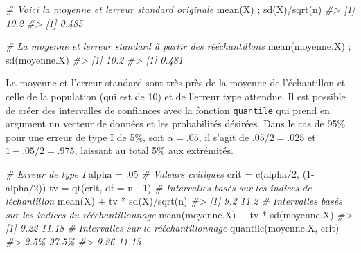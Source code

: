 \documentclass[
]{book}
\newenvironment{Shaded}{}{}
\newcommand{\AttributeTok}[1]{#1}
\newcommand{\CommentTok}[1]{\textit{#1}}
\newcommand{\DecValTok}[1]{#1}
\newcommand{\FunctionTok}[1]{#1}
\newcommand{\NormalTok}[1]{#1}
\newcommand{\OtherTok}[1]{#1}
\newcommand{\SpecialCharTok}[1]{#1}
\begin{document}
\begin{Shaded}
\begin{Highlighting}[]
\CommentTok{\# Voici la moyenne et l\textquotesingle{}erreur standard originale}
\FunctionTok{mean}\NormalTok{(X) ; }\FunctionTok{sd}\NormalTok{(X)}\SpecialCharTok{/}\FunctionTok{sqrt}\NormalTok{(n)}
\CommentTok{\#\textgreater{} [1] 10.2}
\CommentTok{\#\textgreater{} [1] 0.485}

\CommentTok{\# La moyenne et l\textquotesingle{}erreur standard à  partir des rééchantillons}
\FunctionTok{mean}\NormalTok{(moyenne.X)  ; }\FunctionTok{sd}\NormalTok{(moyenne.X)}
\CommentTok{\#\textgreater{} [1] 10.2}
\CommentTok{\#\textgreater{} [1] 0.481}
\end{Highlighting}
\end{Shaded}

La moyenne et l'erreur standard sont très près de la moyenne de l'échantillon et celle de la population (qui est de 10) et de l'erreur type attendue. Il est possible de créer des intervalles de confiances avec la fonction \texttt{quantile} qui prend en argument un vecteur de données et les probabilités désirées. Dans le cas de 95\% pour une erreur de type I de 5\%, soit \(\alpha=.05\), il s'agit de \(.05/2 = .025\) et \(1-.05/2= .975\), laissant au total 5\% aux extrémités.

\begin{Shaded}
\begin{Highlighting}[]
\CommentTok{\# Erreur de type I}
\NormalTok{alpha }\OtherTok{=}\NormalTok{ .}\DecValTok{05}
\CommentTok{\# Valeurs critiques}
\NormalTok{crit }\OtherTok{=} \FunctionTok{c}\NormalTok{(alpha}\SpecialCharTok{/}\DecValTok{2}\NormalTok{, (}\DecValTok{1}\SpecialCharTok{{-}}\NormalTok{alpha}\SpecialCharTok{/}\DecValTok{2}\NormalTok{))}
\NormalTok{tv }\OtherTok{=} \FunctionTok{qt}\NormalTok{(crit, }\AttributeTok{df =}\NormalTok{ n }\SpecialCharTok{{-}} \DecValTok{1}\NormalTok{)}
\CommentTok{\# Intervalles basés sur les indices de l\textquotesingle{}échantillon}
\FunctionTok{mean}\NormalTok{(X) }\SpecialCharTok{+}\NormalTok{ tv }\SpecialCharTok{*} \FunctionTok{sd}\NormalTok{(X)}\SpecialCharTok{/}\FunctionTok{sqrt}\NormalTok{(n)}
\CommentTok{\#\textgreater{} [1]  9.2 11.2}
\CommentTok{\# Intervalles basés sur les indices du rééchantillonnage}
\FunctionTok{mean}\NormalTok{(moyenne.X) }\SpecialCharTok{+}\NormalTok{ tv }\SpecialCharTok{*} \FunctionTok{sd}\NormalTok{(moyenne.X)}
\CommentTok{\#\textgreater{} [1]  9.22 11.18}
\CommentTok{\# Intervalles sur le rééchantillonnage}
\FunctionTok{quantile}\NormalTok{(moyenne.X, crit)}
\CommentTok{\#\textgreater{}  2.5\% 97.5\% }
\CommentTok{\#\textgreater{}  9.26 11.13}
\end{Highlighting}
\end{Shaded}
\end{document}
